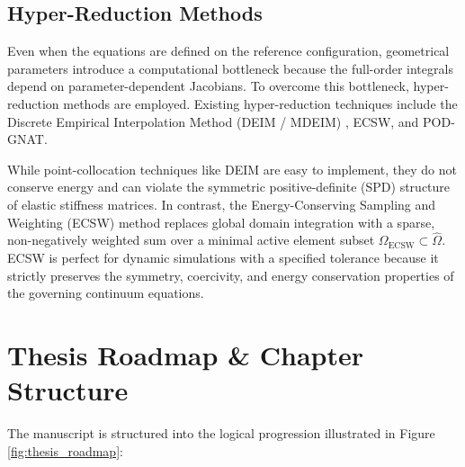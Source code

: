 \subsection{Hyper-Reduction Methods}
Even when the equations are defined on the reference configuration, geometrical parameters introduce a computational bottleneck because the full-order integrals depend on parameter-dependent Jacobians. To overcome this bottleneck, hyper-reduction methods are employed. Existing hyper-reduction techniques include the Discrete Empirical Interpolation Method (DEIM / MDEIM) \cite{Chaturantabut2010, Bonomi2017}, ECSW, and POD-GNAT. 

While point-collocation techniques like DEIM are easy to implement, they do not conserve energy and can violate the symmetric positive-definite (SPD) structure of elastic stiffness matrices. In contrast, the Energy-Conserving Sampling and Weighting (ECSW) method \cite{Farhat2014, farhat2015} replaces global domain integration with a sparse, non-negatively weighted sum over a minimal active element subset $\Omega_{\text{ECSW}} \subset \hat{\Omega}$. ECSW is perfect for dynamic simulations with a specified tolerance because it strictly preserves the symmetry, coercivity, and energy conservation properties of the governing continuum equations.

\section{Thesis Roadmap \& Chapter Structure}

The manuscript is structured into the logical progression illustrated in Figure \ref{fig:thesis_roadmap}:

